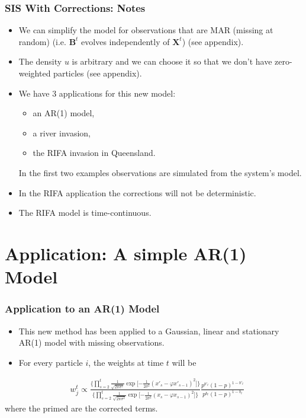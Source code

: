 \documentclass[9pt, xcolor={dvipsnames,svgnames,table}]{beamer}
\begin{document}
\begin{frame}
    \frametitle{SIS With Corrections: Notes}
    \begin{itemize}
        \item We can simplify the model for observations that are \textcolor{PineGreen}{MAR (missing at random)} (i.e. $\bm{B}^t$ evolves independently of $\bm{X}^t$) (see appendix).
        \item \textcolor{PineGreen}{The density $u$ is arbitrary} and we can choose it so that we don't have zero-weighted particles (see appendix).
        \item We have 3 applications for this new model: 
        \begin{itemize}
            \item an \textcolor{PineGreen}{AR(1) model},
            \item a \textcolor{PineGreen}{river invasion},
            \item the \textcolor{PineGreen}{RIFA invasion} in Queensland.
        \end{itemize}
        In the first two examples observations are simulated from the system's model.
        \item In the RIFA application the \textcolor{PineGreen}{corrections will not be deterministic}.
        \item The RIFA model is \textcolor{PineGreen}{time-continuous}.
    \end{itemize}
\end{frame}




\section{Application: A simple AR(1) Model}
\begin{frame}
    \frametitle{Application to an AR(1) Model}
    \begin{itemize}
    \setlength\itemsep{2em}
        \item This new method has been applied to a \textcolor{PineGreen}{Gaussian, linear and stationary AR(1) model with missing observations.}
        \item For every particle $i$, the weights at time $t$ will be
        \end{itemize}
    \begin{align*} \label{eq:2}
        &w^t_j \propto
        \frac{\bigg \{ \prod_{s=2}^{t}  \frac{1}{\sqrt{2 \pi \sigma^{2}}} \exp \bigg [ { - \frac{1}{2 \sigma^{2}} }  (x'_s - \varphi x'_{s-1})^{2} \bigg ] \bigg \} }{\bigg \{ \prod_{s=2}^{t}  \frac{1}{\sqrt{2 \pi \sigma^{2}}} \exp \bigg [ { - \frac{1}{2 \sigma^{2}} }  (x_s - \varphi x_{s-1})^{2} \bigg ] \bigg \} } \nonumber
        \frac{p^{b'_t} (1 - p)^{1-b'_t}  }{ p^{b_t} (1 - p)^{1-b_t} }
    \end{align*}
    where the primed are the corrected terms.
\end{frame}
\end{document}
